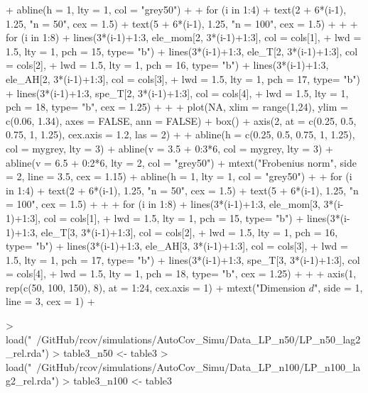 \documentclass{article}
\begin{document}
\begin{Schunk}
\begin{Sinput}
{+   abline(h = 1, lty = 1, col = "grey50")
+ 
+   for (i in 1:4){
+     text(2 + 6*(i-1), 1.25, "n = 50", cex = 1.5)
+     text(5 + 6*(i-1), 1.25, "n = 100", cex = 1.5)
+   }
+ 
+   for (i in 1:8){
+     lines(3*(i-1)+1:3, ele_mom[2, 3*(i-1)+1:3], col = cols[1],
+           lwd = 1.5, lty = 1, pch = 15, type= "b")
+     lines(3*(i-1)+1:3, ele_T[2, 3*(i-1)+1:3], col = cols[2],
+           lwd = 1.5, lty = 1, pch = 16, type= "b")
+     lines(3*(i-1)+1:3, ele_AH[2, 3*(i-1)+1:3], col = cols[3],
+           lwd = 1.5, lty = 1, pch = 17, type= "b")
+     lines(3*(i-1)+1:3, spe_T[2, 3*(i-1)+1:3], col = cols[4],
+           lwd = 1.5, lty = 1, pch = 18, type= "b", cex = 1.25)
+   }
+ 
+   plot(NA, xlim = range(1,24), ylim = c(0.06, 1.34), axes = FALSE, ann = FALSE)
+   box()
+   axis(2, at = c(0.25, 0.5, 0.75, 1, 1.25), cex.axis = 1.2, las = 2)
+ 
+   abline(h = c(0.25, 0.5, 0.75, 1, 1.25), col = mygrey, lty = 3)
+   abline(v = 3.5 + 0:3*6, col = mygrey, lty = 3)
+   abline(v = 6.5 + 0:2*6, lty = 2, col = "grey50")
+   mtext("Frobenius norm", side = 2, line = 3.5, cex = 1.15)
+   abline(h = 1, lty = 1, col = "grey50")
+ 
+   for (i in 1:4){
+     text(2 + 6*(i-1), 1.25, "n = 50", cex = 1.5)
+     text(5 + 6*(i-1), 1.25, "n = 100", cex = 1.5)
+   }
+ 
+   for (i in 1:8){
+     lines(3*(i-1)+1:3, ele_mom[3, 3*(i-1)+1:3], col = cols[1],
+           lwd = 1.5, lty = 1, pch = 15, type= "b")
+     lines(3*(i-1)+1:3, ele_T[3, 3*(i-1)+1:3], col = cols[2],
+           lwd = 1.5, lty = 1, pch = 16, type= "b")
+     lines(3*(i-1)+1:3, ele_AH[3, 3*(i-1)+1:3], col = cols[3],
+           lwd = 1.5, lty = 1, pch = 17, type= "b")
+     lines(3*(i-1)+1:3, spe_T[3, 3*(i-1)+1:3], col = cols[4],
+           lwd = 1.5, lty = 1, pch = 18, type= "b", cex = 1.25)
+   }
+ 
+   axis(1, rep(c(50, 100, 150), 8), at = 1:24, cex.axis = 1)
+   mtext("Dimension $d$", side = 1, line = 3, cex = 1)
+ }
\end{Sinput}
\end{Schunk}

\begin{Schunk}
\begin{Sinput}
> load("~/GitHub/rcov/simulations/AutoCov_Simu/Data_LP_n50/LP_n50_lag2_rel.rda")
> table3_n50 <- table3
> load("~/GitHub/rcov/simulations/AutoCov_Simu/Data_LP_n100/LP_n100_lag2_rel.rda")
> table3_n100 <- table3
\end{Sinput}
\end{Schunk}
\end{document}
